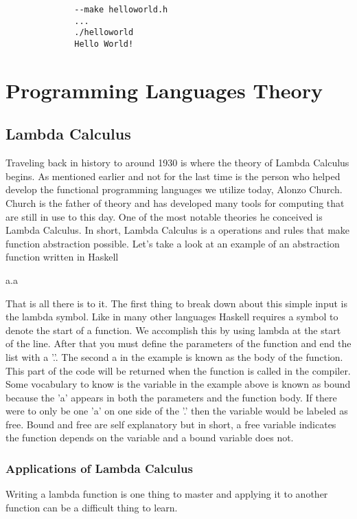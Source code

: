 \documentclass{article}
\begin{document}
    \begin{lstlisting}
              --make helloworld.h
              ...
              ./helloworld
              Hello World!
    \end{lstlisting}
    

\section{Programming Languages Theory}
    \subsection{Lambda Calculus}
    Traveling back in history to around 1930 is where the theory of Lambda Calculus begins. As mentioned earlier and not for the last time is the person who helped develop the functional programming languages we utilize today, Alonzo Church. Church is the father of theory and has developed many tools for computing that are still in use to this day. One of the most notable theories he conceived is Lambda Calculus. In short, Lambda Calculus is a operations and rules that make function abstraction possible. Let's take a look at an example of an abstraction function written in Haskell
    
    \medskip
              \lambda a.a
    \medskip
    
    \noindent That is all there is to it. The first thing to break down about this simple input is the lambda symbol. Like in many other languages Haskell requires a symbol to denote the start of a function. We accomplish this by using lambda at the start of the line. After that you must define the parameters of the function and end the list with a '.'. The second a in the example is known as the body of the function. This part of the code will be returned when the function is called in the compiler. Some vocabulary to know is the variable in the example above is known as bound because the 'a' appears in both the parameters and the function body. If there were to only be one 'a' on one side of the '.' then the variable would be labeled as free. Bound and free are self explanatory but in short, a free variable indicates the function depends on the variable and a bound variable does not. 
        \subsubsection{Applications of Lambda Calculus}
        Writing a lambda function is one thing to master and applying it to another function can be a difficult thing to learn. 
    
\end{document}
